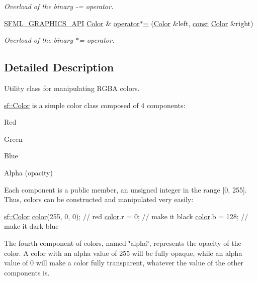 \begin{DoxyCompactItemize}
\begin{DoxyCompactList}\small\item\em Overload of the binary -\/= operator. \end{DoxyCompactList}\item 
\hyperlink{sfml_2dep_2_s_f_m_l-2_84_82_2include_2_s_f_m_l_2_graphics_2_export_8hpp_ab84c9f1035e146917de3bc0f98d72b35}{S\-F\-M\-L\-\_\-\-G\-R\-A\-P\-H\-I\-C\-S\-\_\-\-A\-P\-I} \hyperlink{classsf_1_1_color}{Color} \& \hyperlink{classsf_1_1_color_a8953be58a47ced92fb25966d6ee90511}{operator$\ast$=} (\hyperlink{classsf_1_1_color}{Color} \&left, \hyperlink{term__entry_8h_a57bd63ce7f9a353488880e3de6692d5a}{const} \hyperlink{classsf_1_1_color}{Color} \&right)
\begin{DoxyCompactList}\small\item\em Overload of the binary $\ast$= operator. \end{DoxyCompactList}\end{DoxyCompactItemize}


\subsection{Detailed Description}
Utility class for manipulating R\-G\-B\-A colors. 

\hyperlink{classsf_1_1_color}{sf\-::\-Color} is a simple color class composed of 4 components\-: \begin{DoxyItemize}
\item Red \item Green \item Blue \item Alpha (opacity)\end{DoxyItemize}
Each component is a public member, an unsigned integer in the range \mbox{[}0, 255\mbox{]}. Thus, colors can be constructed and manipulated very easily\-:


\begin{DoxyCode}
\hyperlink{classsf_1_1_color}{sf::Color} \hyperlink{_entity_8cpp_a864889304a90873adb9c6e289a54bcf4}{color}(255, 0, 0); \textcolor{comment}{// red}
\hyperlink{_entity_8cpp_a864889304a90873adb9c6e289a54bcf4}{color}.r = 0;                \textcolor{comment}{// make it black}
\hyperlink{_entity_8cpp_a864889304a90873adb9c6e289a54bcf4}{color}.b = 128;              \textcolor{comment}{// make it dark blue}
\end{DoxyCode}


The fourth component of colors, named \char`\"{}alpha\char`\"{}, represents the opacity of the color. A color with an alpha value of 255 will be fully opaque, while an alpha value of 0 will make a color fully transparent, whatever the value of the other components is.

